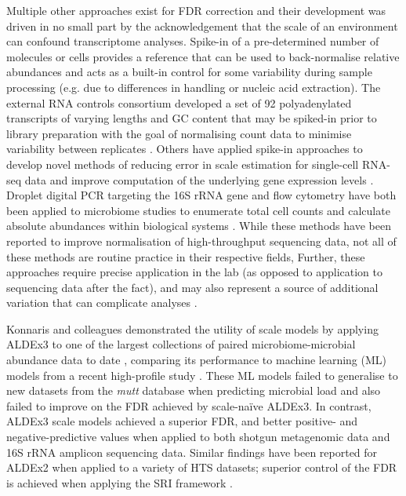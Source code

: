 \documentclass[10pt,letterpaper]{article}
\begin{document}
Multiple other approaches exist for FDR correction and their development was driven in no small part by the acknowledgement that the scale of an environment can confound transcriptome analyses. Spike-in of a pre-determined number of molecules or cells provides a reference that can be used to back-normalise relative abundances and acts as a built-in control for some variability during sample processing \cite{rao_multi-kingdom_2021} (e.g. due to differences in handling or nucleic acid extraction). The external RNA controls consortium developed a set of 92 polyadenylated transcripts of varying lengths and GC content that may be spiked-in prior to library preparation with the goal of normalising count data to minimise variability between replicates \cite{baker_external_2005}. Others have applied spike-in approaches to develop novel methods of reducing error in scale estimation for single-cell RNA-seq data and improve computation of the underlying gene expression levels \cite{ding_normalization_2015}. Droplet digital PCR targeting the 16S rRNA gene and flow cytometry have both been applied to microbiome studies to enumerate total cell counts and calculate absolute abundances within biological systems \cite{lin_towards_2019, barlow_quantitative_2020}. While these methods have been reported to improve normalisation of high-throughput sequencing data, not all of these methods are routine practice in their respective fields, Further, these approaches require precise application in the lab (as opposed to application to sequencing data after the fact), and may also represent a source of additional variation that can complicate analyses \cite{risso_normalization_2014}.

Konnaris and colleagues demonstrated the utility of scale models by applying ALDEx3 to one of the largest collections of paired microbiome-microbial abundance data to date \cite{konnaris_uncertainty_2025}, comparing its performance to machine learning (ML) models from a recent high-profile study \cite{nishijima_fecal_2025}. These ML models failed to generalise to new datasets from the \textit{mutt} database \cite{konnaris_uncertainty_2025} when predicting microbial load and also failed to improve on the FDR achieved by scale-na\"ive ALDEx3. In contrast, ALDEx3 scale models achieved a superior FDR, and better positive- and negative-predictive values when applied to both shotgun metagenomic data and 16S rRNA amplicon sequencing data. Similar findings have been reported for ALDEx2 when applied to a variety of HTS datasets; superior control of the FDR is achieved when applying the SRI framework \cite{gloor_explicit_2025}.
\end{document}
